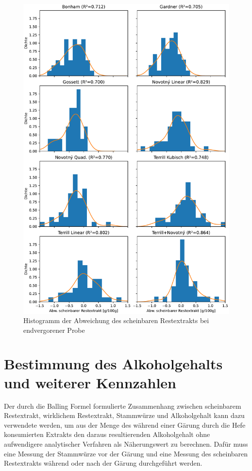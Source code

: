 \documentclass[a4paper,parskip=half]{scrartcl}
\begin{document}
\begin{figure}[H]
\centering
\includegraphics[width=14cm]{graph_ae.pdf}
\caption{Histogramm der Abweichung des scheinbaren Restextrakts bei endvergorener Probe}
\label{fig:aegraph}
\end{figure}


\section*{Bestimmung des Alkoholgehalts und weiterer Kennzahlen}

Der durch die Balling Formel formulierte Zusammenhang zwischen
scheinbarem Restextrakt, wirklichem Restextrakt, Stammwürze
und Alkoholgehalt kann dazu verwendete werden, um aus der
Menge des während einer Gärung durch die Hefe konsumierten
Extrakts den daraus resultierenden Alkoholgehalt ohne aufwendigere
analytischer Verfahren als Näherungswert zu berechnen. Dafür muss
eine Messung der Stammwürze vor der Gärung und eine Messung des
scheinbaren Restextrakts während oder nach der Gärung durchgeführt
werden. \autocite{MEBAK2013,Spedding2016}
\end{document}
